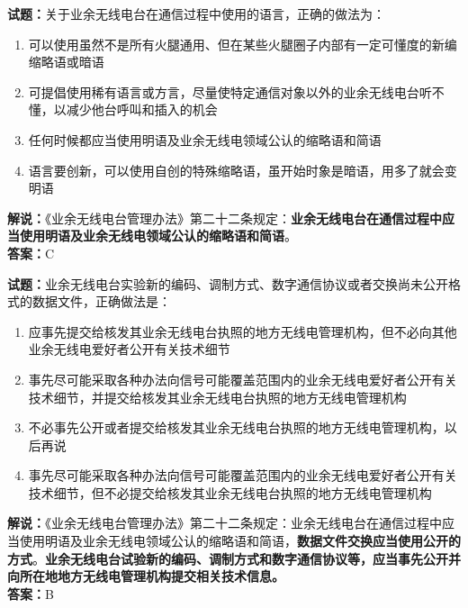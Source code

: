 \documentclass{ctexbook}
\begin{document}
\bigskip


\noindent\textbf{试题：}关于业余无线电台在通信过程中使用的语言，正确的做法为：
\begin{enumerate}[leftmargin=3em]
	\item 可以使用虽然不是所有火腿通用、但在某些火腿圈子内部有一定可懂度的新编缩略语或暗语
	\item 可提倡使用稀有语言或方言，尽量使特定通信对象以外的业余无线电台听不懂，以减少他台呼叫和插入的机会
	\item 任何时候都应当使用明语及业余无线电领域公认的缩略语和简语
	\item 语言要创新，可以使用自创的特殊缩略语，虽开始时象是暗语，用多了就会变明语
\end{enumerate}
\noindent\textbf{解说：}《业余无线电台管理办法》第二十二条规定：\textbf{业余无线电台在通信过程中应当使用明语及业余无线电领域公认的缩略语和简语}。\\\noindent\textbf{答案：}C



\bigskip


\noindent\textbf{试题：}业余无线电台实验新的编码、调制方式、数字通信协议或者交换尚未公开格式的数据文件，正确做法是：
\begin{enumerate}[leftmargin=3em]
	\item 应事先提交给核发其业余无线电台执照的地方无线电管理机构，但不必向其他业余无线电爱好者公开有关技术细节
	\item 事先尽可能采取各种办法向信号可能覆盖范围内的业余无线电爱好者公开有关技术细节，并提交给核发其业余无线电台执照的地方无线电管理机构
	\item 不必事先公开或者提交给核发其业余无线电台执照的地方无线电管理机构，以后再说
	\item 事先尽可能采取各种办法向信号可能覆盖范围内的业余无线电爱好者公开有关技术细节，但不必提交给核发其业余无线电台执照的地方无线电管理机构
\end{enumerate}
\noindent\textbf{解说：}《业余无线电台管理办法》第二十二条规定：业余无线电台在通信过程中应当使用明语及业余无线电领域公认的缩略语和简语，\textbf{数据文件交换应当使用公开的方式}。\textbf{业余无线电台试验新的编码、调制方式和数字通信协议等，应当事先公开并向所在地地方无线电管理机构提交相关技术信息。}\\\noindent\textbf{答案：}B



\bigskip
\end{document}
